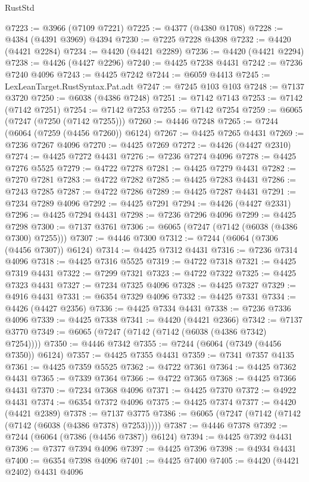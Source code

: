\begin{lexlean}{RustStd}
\begin{coremodule}
@7223 := @3966 (@7109 @7221)
@7225 := @4377 (@4380 @1708)
@7228 := @4384 (@4391 @3969) @4394
@7230 := @7225 @7228 @4398
@7232 := @4420 (@4421 @2284)
@7234 := @4420 (@4421 @2289)
@7236 := @4420 (@4421 @2294)
@7238 := @4426 (@4427 @2296)
@7240 := @4425 @7238 @4431
@7242 := @7236 @7240 @4096
@7243 := @4425 @7242
@7244 := @6059 @4413
@7245 := LexLeanTarget.RustSyntax.Pat.adt
@7247 := @7245 @103 @103
@7248 := @7137 @3720
@7250 := @6038 (@4386 @7248)
@7251 := @7142 @7143
@7253 := @7142 (@7142 @7251)
@7254 := @7142 @7253
@7255 := @7142 @7254
@7259 := @6065 (@7247 (@7250 (@7142 @7255)))
@7260 := @4446 @7248
@7265 := @7244 (@6064 (@7259 (@4456 @7260)) @6124)
@7267 := @4425 @7265 @4431
@7269 := @7236 @7267 @4096
@7270 := @4425 @7269
@7272 := @4426 (@4427 @2310)
@7274 := @4425 @7272 @4431
@7276 := @7236 @7274 @4096
@7278 := @4425 @7276 @5525
@7279 := @4722 @7278
@7281 := @4425 @7279 @4431
@7282 := @7270 @7281
@7283 := @4722 @7282
@7285 := @4425 @7283 @4431
@7286 := @7243 @7285
@7287 := @4722 @7286
@7289 := @4425 @7287 @4431
@7291 := @7234 @7289 @4096
@7292 := @4425 @7291
@7294 := @4426 (@4427 @2331)
@7296 := @4425 @7294 @4431
@7298 := @7236 @7296 @4096
@7299 := @4425 @7298
@7300 := @7137 @3761
@7306 := @6065 (@7247 (@7142 (@6038 (@4386 @7300) @7255)))
@7307 := @4446 @7300
@7312 := @7244 (@6064 (@7306 (@4456 @7307)) @6124)
@7314 := @4425 @7312 @4431
@7316 := @7236 @7314 @4096
@7318 := @4425 @7316 @5525
@7319 := @4722 @7318
@7321 := @4425 @7319 @4431
@7322 := @7299 @7321
@7323 := @4722 @7322
@7325 := @4425 @7323 @4431
@7327 := @7234 @7325 @4096
@7328 := @4425 @7327
@7329 := @4916 @4431
@7331 := @6354 @7329 @4096
@7332 := @4425 @7331
@7334 := @4426 (@4427 @2356)
@7336 := @4425 @7334 @4431
@7338 := @7236 @7336 @4096
@7339 := @4425 @7338
@7341 := @4420 (@4421 @2366)
@7342 := @7137 @3770
@7349 := @6065 (@7247 (@7142 (@7142 (@6038 (@4386 @7342) @7254))))
@7350 := @4446 @7342
@7355 := @7244 (@6064 (@7349 (@4456 @7350)) @6124)
@7357 := @4425 @7355 @4431
@7359 := @7341 @7357 @4135
@7361 := @4425 @7359 @5525
@7362 := @4722 @7361
@7364 := @4425 @7362 @4431
@7365 := @7339 @7364
@7366 := @4722 @7365
@7368 := @4425 @7366 @4431
@7370 := @7234 @7368 @4096
@7371 := @4425 @7370
@7372 := @4922 @4431
@7374 := @6354 @7372 @4096
@7375 := @4425 @7374
@7377 := @4420 (@4421 @2389)
@7378 := @7137 @3775
@7386 := @6065 (@7247 (@7142 (@7142 (@7142 (@6038 (@4386 @7378) @7253)))))
@7387 := @4446 @7378
@7392 := @7244 (@6064 (@7386 (@4456 @7387)) @6124)
@7394 := @4425 @7392 @4431
@7396 := @7377 @7394 @4096
@7397 := @4425 @7396
@7398 := @4934 @4431
@7400 := @6354 @7398 @4096
@7401 := @4425 @7400
@7405 := @4420 (@4421 @2402) @4431 @4096

\end{coremodule}
\end{lexlean}
